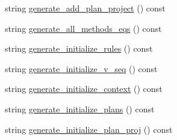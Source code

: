 \begin{DoxyCompactItemize}
\item 
string \hyperlink{classgenevalmag_1_1Builder__code_a16c49d69826f56e892f3580cdc7fa610}{generate\_\-add\_\-plan\_\-project} () const 
\item 
string \hyperlink{classgenevalmag_1_1Builder__code_aa13031885f7de51469cc9e1ea5a4b9e6}{generate\_\-all\_\-methods\_\-eqs} () const 
\item 
string \hyperlink{classgenevalmag_1_1Builder__code_a5b244721c0c026570512c5e92acf3c7c}{generate\_\-initialize\_\-rules} () const 
\item 
string \hyperlink{classgenevalmag_1_1Builder__code_aa22bd086103a19a4d6dade0cab84b62d}{generate\_\-initialize\_\-v\_\-seq} () const 
\item 
string \hyperlink{classgenevalmag_1_1Builder__code_aeb44411cbae61fe53b734486945ab7f4}{generate\_\-initialize\_\-context} () const 
\item 
string \hyperlink{classgenevalmag_1_1Builder__code_a4ff44b4aeb0d64f987f58754b997dbef}{generate\_\-initialize\_\-plans} () const 
\item 
string \hyperlink{classgenevalmag_1_1Builder__code_a76c0b81220998ec7e604184fab7a15fe}{generate\_\-initialize\_\-plan\_\-proj} () const 
\end{DoxyCompactItemize}
